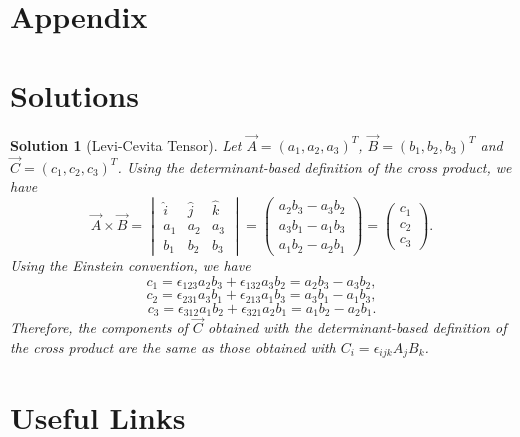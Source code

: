 \documentclass{article}
\newtheorem{solution}{Solution}
\begin{document}
\section{Appendix}

\section{Solutions}
\begin{solution}[Levi-Cevita Tensor]
    Let $\vec{A} = (a_1, a_2, a_3)^T$, $\vec{B} = (b_1, b_2, b_3)^T$ and $\vec{C} = (c_1, c_2, c_3)^T$. Using the determinant-based definition of the cross product, we have
    \[\vec{A} \times \vec{B} = \begin{vmatrix}\hat{i} & \hat{j} & \hat{k} \\ a_1 & a_2 & a_3 \\ b_1 & b_2 & b_3\end{vmatrix} = \begin{pmatrix}a_2 b_3 - a_3 b_2 \\ a_3 b_1 - a_1 b_3 \\ a_1 b_2 - a_2 b_1\end{pmatrix} = \begin{pmatrix}c_1 \\ c_2 \\ c_3\end{pmatrix}.\]
    Using the Einstein convention, we have
    \[c_1 = \epsilon_{123} a_2 b_3 + \epsilon_{132} a_3 b_2 = a_2 b_3 - a_3 b_2,\]
    \[c_2 = \epsilon_{231} a_3 b_1 + \epsilon_{213} a_1 b_3 = a_3 b_1 - a_1 b_3,\]
    \[c_3 = \epsilon_{312} a_1 b_2 + \epsilon_{321} a_2 b_1 = a_1 b_2 - a_2 b_1.\]
    Therefore, the components of $\vec{C}$ obtained with the determinant-based definition of the cross product are the same as those obtained with $C_i = \epsilon_{ijk} A_j B_k$.
\end{solution}

\section{Useful Links}
\end{document}
